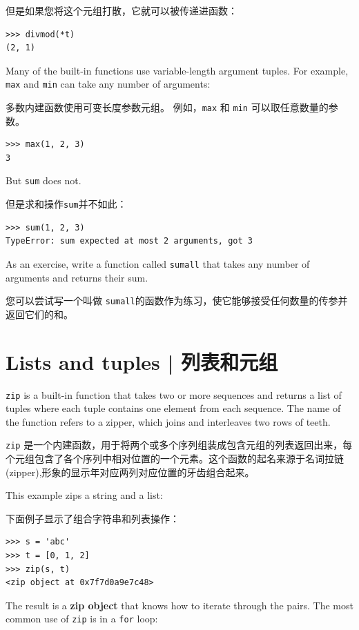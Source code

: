 但是如果您将这个元组打散，它就可以被传递进函数：

\begin{lstlisting}
>>> divmod(*t)
(2, 1)
\end{lstlisting}

%
Many of the built-in functions use
variable-length argument tuples.  For example, {\tt max}
and {\tt min} can take any number of arguments:

多数内建函数使用可变长度参数元组。 例如，\lstinline{max} 和 \lstinline{min} 可以取任意数量的参数。

 
 

\begin{lstlisting}
>>> max(1, 2, 3)
3
\end{lstlisting}
%
But {\tt sum} does not.

但是求和操作\lstinline{sum}并不如此：
 

\begin{lstlisting}
>>> sum(1, 2, 3)
TypeError: sum expected at most 2 arguments, got 3
\end{lstlisting}
%
As an exercise, write a function called {\tt sumall} that takes any number
of arguments and returns their sum.

您可以尝试写一个叫做 \lstinline{sumall}的函数作为练习，使它能够接受任何数量的传参并返回它们的和。

\section{Lists and tuples | 列表和元组}
 

{\tt zip} is a built-in function that takes two or more sequences and
returns a list of tuples where each tuple contains one
element from each sequence.  The name of the function refers to
a zipper, which joins and interleaves two rows of teeth.

\lstinline{zip} 是一个内建函数，用于将两个或多个序列组装成包含元组的列表返回出来，每个元组包含了各个序列中相对位置的一个元素。这个函数的起名来源于名词拉链(zipper),形象的显示年对应两列对应位置的牙齿组合起来。

This example zips a string and a list:

下面例子显示了组合字符串和列表操作：

\begin{lstlisting}
>>> s = 'abc'
>>> t = [0, 1, 2]
>>> zip(s, t)
<zip object at 0x7f7d0a9e7c48>
\end{lstlisting}
%
The result is a {\bf zip object} that knows how to iterate through
the pairs.  The most common use of {\tt zip} is in a {\tt for} loop:


